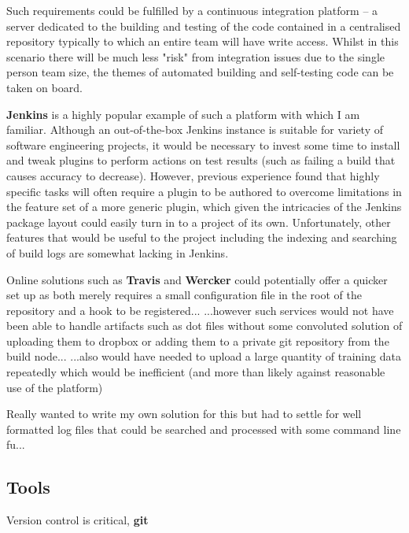 Such requirements could be fulfilled by a continuous integration platform -- a
server dedicated to the building and testing of the code contained in a
centralised repository typically to which an entire team will have write
access\citep{fowler-ci}. Whilst in this scenario there will be much less "risk"
from integration issues due to the single person team size, the themes of
automated building and self-testing code can be taken on board.

\textbf{Jenkins} is a highly popular\cite{jenkins-stats} example of such a
platform with which I am familiar. Although an out-of-the-box Jenkins instance is
suitable for variety of software engineering projects, it would be necessary to
invest some time to install and tweak plugins to perform actions on test results
(such as failing a build that causes accuracy to decrease). However, previous
experience found that highly specific tasks will often require a plugin to be
authored to overcome limitations in the feature set of a more generic plugin,
which given the intricacies of the Jenkins package layout could easily
turn in to a project of its own. Unfortunately, other features that would be
useful to the project including the indexing and searching of build logs are
somewhat lacking in Jenkins.

Online solutions such as \textbf{Travis} and \textbf{Wercker} could potentially
offer a quicker set up as both merely requires a small configuration file in the
root of the repository and a hook to be registered...
...however such services would
not have been able to handle artifacts such as dot files without some convoluted
solution of uploading them to dropbox or adding them to a private git repository
from the build node...  ...also would have needed to upload a large
quantity of training data repeatedly which would be inefficient (and more than
likely against reasonable use of the platform)

Really wanted to write my own solution for this but had to settle for well
formatted log files that could be searched and processed with some command line
fu...


\subsection{Tools}
\label{part1:dev:tools}

Version control is critical, \textbf{git}


